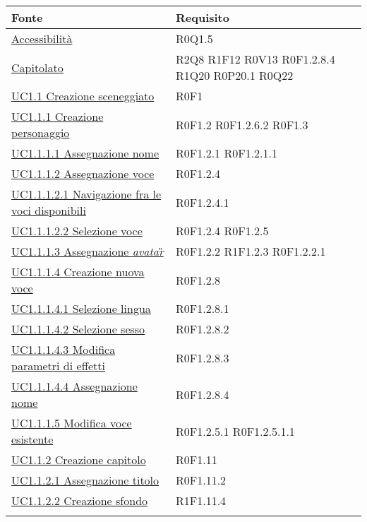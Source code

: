 \begin{center}
\def\arraystretch{1.6}
\bgroup
\begin{longtable}{| p{10.25cm} | p{2.5cm} | }
\hline
\textbf{Fonte} & \textbf{Requisito} \\ \hline \hline  \hyperref[sec:Accessibilità ]{ Accessibilità   } &  R0Q1.5  \\ \hline  \hyperref[sec:Capitolato]{ Capitolato  } &  R2Q8  \newline R1F12  \newline R0V13  \newline R0F1.2.8.4  \newline R1Q20  \newline R0P20.1  \newline R0Q22  \\ \hline  \hyperref[sec:UC1.1]{ UC1.1 Creazione sceneggiato } &  R0F1  \\ \hline  \hyperref[sec:UC1.1.1]{ UC1.1.1 Creazione personaggio } &  R0F1.2  \newline R0F1.2.6.2  \newline R0F1.3  \\ \hline  \hyperref[sec:UC1.1.1.1]{ UC1.1.1.1 Assegnazione nome } &  R0F1.2.1  \newline R0F1.2.1.1  \\ \hline  \hyperref[sec:UC1.1.1.2]{ UC1.1.1.2 Assegnazione voce } &  R0F1.2.4  \\ \hline  \hyperref[sec:UC1.1.1.2.1]{ UC1.1.1.2.1 Navigazione fra le voci disponibili } &  R0F1.2.4.1  \\ \hline  \hyperref[sec:UC1.1.1.2.2]{ UC1.1.1.2.2 Selezione voce } &  R0F1.2.4  \newline R0F1.2.5  \\ \hline  \hyperref[sec:UC1.1.1.3]{ UC1.1.1.3 Assegnazione \textit{avatar}\G } &  R0F1.2.2  \newline R1F1.2.3  \newline R0F1.2.2.1  \\ \hline  \hyperref[sec:UC1.1.1.4]{ UC1.1.1.4 Creazione nuova voce } &  R0F1.2.8  \\ \hline  \hyperref[sec:UC1.1.1.4.1]{ UC1.1.1.4.1 Selezione lingua } &  R0F1.2.8.1  \\ \hline  \hyperref[sec:UC1.1.1.4.2]{ UC1.1.1.4.2 Selezione sesso } &  R0F1.2.8.2  \\ \hline  \hyperref[sec:UC1.1.1.4.3]{ UC1.1.1.4.3 Modifica parametri di effetti } &  R0F1.2.8.3  \\ \hline  \hyperref[sec:UC1.1.1.4.4]{ UC1.1.1.4.4 Assegnazione nome } &  R0F1.2.8.4  \\ \hline  \hyperref[sec:UC1.1.1.5]{ UC1.1.1.5 Modifica voce esistente } &  R0F1.2.5.1  \newline R0F1.2.5.1.1  \\ \hline  \hyperref[sec:UC1.1.2]{ UC1.1.2 Creazione capitolo } &  R0F1.11  \\ \hline  \hyperref[sec:UC1.1.2.1]{ UC1.1.2.1 Assegnazione titolo } &  R0F1.11.2  \\ \hline  \hyperref[sec:UC1.1.2.2]{ UC1.1.2.2 Creazione sfondo } &  R1F1.11.4  \\ \hline  \hyperref[sec:UC1.1.2.2.1]{ 
\end{longtable}
\end{center}
